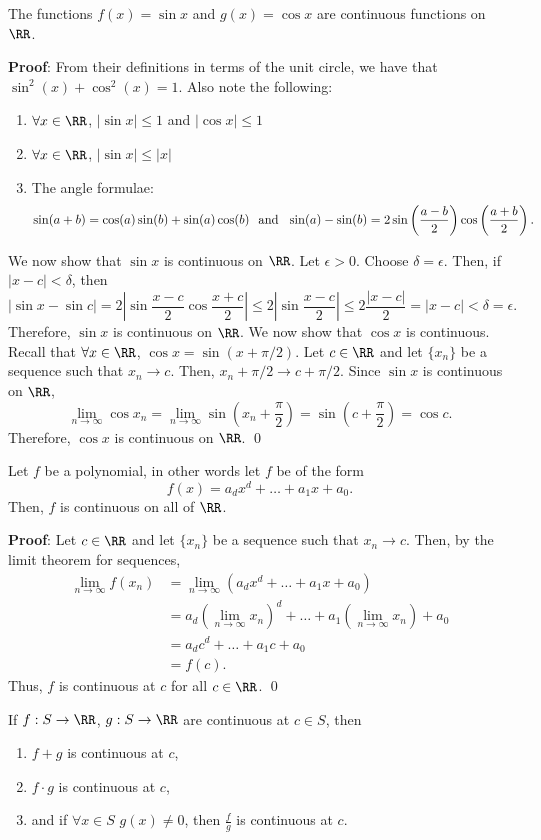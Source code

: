 \begin{theorem}
The functions $f(x) = \sin x$ and $g(x) = \cos x$ are continuous functions on $\RR$.
\end{theorem}
\textbf{Proof}: From their definitions in terms of the unit circle, we have that $\sin^2(x) + \cos^2(x) = 1$. Also note the following:
\begin{enumerate}
    \item $\forall x\in \RR$, $|\sin x| \leq 1$ and $|\cos x|\leq 1$
    \item $\forall x\in \RR$, $|\sin x| \leq |x|$
    \item The angle formulae: \[\sin(a+b) = \cos(a) \sin(b) + \sin(a) \cos(b)
    \hspace{.25cm} \text{and} \hspace{.25cm} \sin(a) - \sin(b) = 2\sin\left(\frac{a-b}{2}\right)\cos\left(\frac{a+b}{2}\right).
    \]
\end{enumerate}
We now show that $\sin x$ is continuous on $\RR$. Let $\epsilon>0$. Choose $\delta = \epsilon$. Then, if $|x-c|< \delta$, then 
\[|\sin x - \sin c| = 2\left|\sin \frac{x-c}{2} \cos \frac{x+c}{2}\right| \leq 2\left|\sin \frac{x-c}{2}\right| \leq 2\frac{|x-c|}{2} = |x-c| < \delta = \epsilon.\]
Therefore, $\sin x$ is continuous on $\RR$. We now show that $\cos x$ is continuous. Recall that $\forall x\in \RR$, $\cos x = \sin(x+ \pi/2)$. Let $c\in \RR$ and let $\{x_n\}$ be a sequence such that $x_n \to c$. Then, $x_n+\pi/2\to c+\pi/2$. Since $\sin x$ is continuous on $\RR$,
\[
\lim_{n\to \infty}\cos x_n = \lim_{n\to \infty}\sin\left(x_n + \frac{\pi}{2}\right) = \sin\left(c + \frac{\pi}{2}\right) = \cos c.
\]
Therefore, $\cos x$ is continuous on $\RR$. \qed 

\begin{theorem}
Let $f$ be a polynomial, in other words let $f$ be of the form 
\[
f(x) = a_d x^d + \dots + a_1 x + a_0.
\]
Then, $f$ is continuous on all of $\RR$.
\end{theorem}
\textbf{Proof}: Let $c\in \RR$ and let $\{x_n\}$ be a  sequence such that $x_n\to c$. Then, by the limit theorem for sequences, 
\begin{align*}
    \lim_{n\to \infty} f(x_n) &= \lim_{n\to \infty} (a_d x^d + \dots + a_1 x + a_0) \\
    &= a_d(\lim_{n\to \infty} x_n)^d + \dots + a_1 (\lim_{n\to \infty} x_n) + a_0 \\
    &= a_d c^d + \dots + a_1c + a_0 \\
    &= f(c).
\end{align*}
Thus, $f$ is continuous at $c$ for all $c\in \RR$. \qed 
\begin{theorem}
If $f: S\to \RR$, $g:S\to \RR$ are continuous at $c\in S$, then 
\begin{enumerate}
    \item $f+g$ is continuous at $c$,
    \item $f\cdot g$ is continuous at $c$,
    \item and if $\forall x\in S$ $g(x) \neq 0$, then $\frac{f}{g}$ is continuous at $c$.
\end{enumerate}
\end{theorem}

